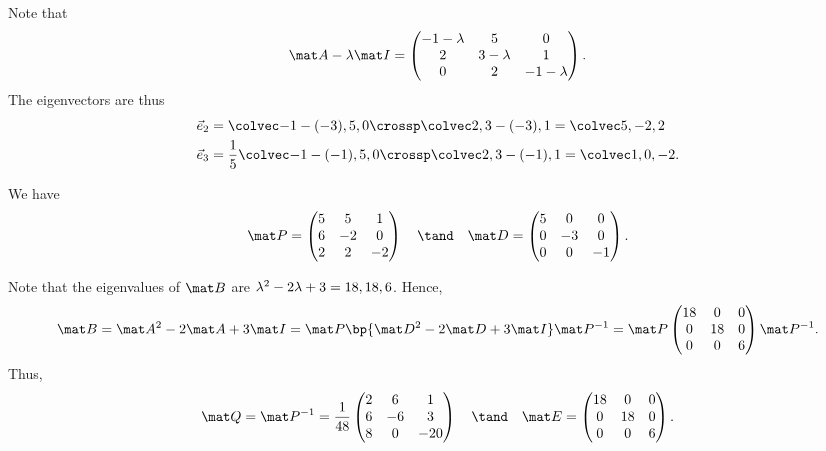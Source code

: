 \begin{solution}
\begin{ppart}
        Note that \[\mat A - \l \mat I = \begin{pmatrix}-1 - \l & 5 & 0 \\ 2 & 3-\l & 1 \\ 0 & 2 & -1-\l\end{pmatrix}.\] The eigenvectors are thus
        \begin{align*}
            \vec e_2 &= \cveciii{-1-(-3)}50 \crossp \cveciii2{3-(-3)}1 = \cveciii5{-2}2\\
            \vec e_3 &= \frac15 \cveciii{-1-(-1)}50 \crossp \cveciii2{3-(-1)}1 = \cveciii10{-2}.
        \end{align*}
    \end{ppart}
    \begin{ppart}
        We have \[\mat P = \begin{pmatrix}5 & 5 & 1 \\ 6 & -2 & 0 \\ 2 & 2 & -2\end{pmatrix} \quad \tand \quad \mat D = \begin{pmatrix}5 & 0 & 0 \\ 0 & -3 & 0 \\ 0 & 0 & -1\end{pmatrix}.\]
    \end{ppart}
    \begin{ppart}
        Note that the eigenvalues of $\mat B$ are $\lambda^2 - 2\lambda + 3 = 18, 18, 6$. Hence, \[\mat B = \mat A^2 - 2 \mat A + 3 \mat I = \mat P \bp{\mat D^2 - 2\mat D + 3\mat I} \mat P^{-1} = \mat P \begin{pmatrix}18 & 0 & 0 \\ 0 & 18 & 0 \\ 0 & 0 & 6\end{pmatrix} \mat P^{-1}.\] Thus, \[\mat Q = \mat P^{-1} = \frac1{48} \begin{pmatrix}2 & 6 & 1 \\ 6 & -6 & 3 \\ 8 & 0 & -20\end{pmatrix} \quad \tand \quad \mat E = \begin{pmatrix}18 & 0 & 0 \\ 0 & 18 & 0 \\ 0 & 0 & 6\end{pmatrix}.\]
    \end{ppart}
\end{solution}

